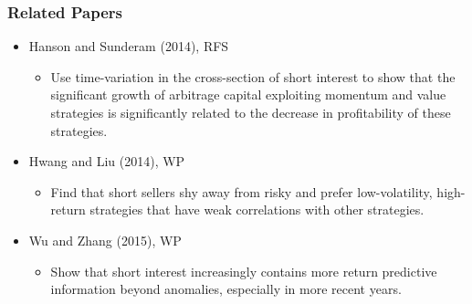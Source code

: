 \documentclass{beamer}
\begin{document}
\begin{frame}
		\frametitle{Related Papers}
	\begin{itemize}
\item Hanson and Sunderam (2014), RFS
	\begin{itemize}
\item Use time-variation in the cross-section of short interest to show that the significant growth of arbitrage capital exploiting momentum and value strategies is significantly related to the decrease in profitability of these strategies.
 	\end{itemize}
\item Hwang and Liu (2014), WP
	\begin{itemize}
\item Find that short sellers shy away from risky and prefer low-volatility, high-return  strategies  that  have  weak  correlations  with  other  strategies.
	\end{itemize}
\item Wu and Zhang (2015), WP
	\begin{itemize}
\item Show that short interest increasingly contains more return predictive information  beyond  anomalies, especially in more recent years.
	\end{itemize} 

 
	\end{itemize} 

\end{frame}
\end{document}
